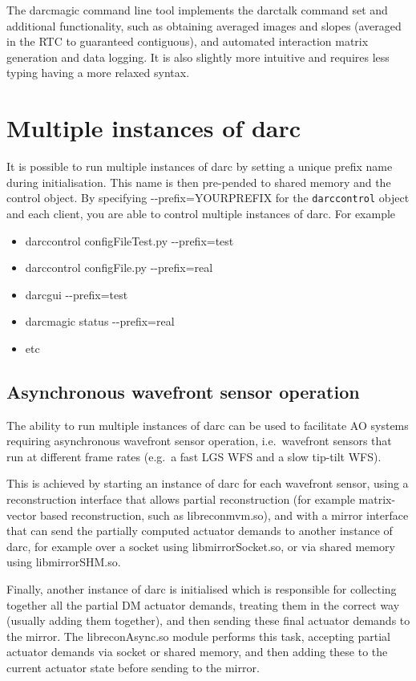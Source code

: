 \documentclass[a4,10pt]{article}
\begin{document}
The darcmagic command line tool implements the darctalk command set
and additional functionality, such as obtaining averaged images and
slopes (averaged in the RTC to guaranteed contiguous), and automated
interaction matrix generation and data logging.  It is also slightly
more intuitive and requires less typing having a more relaxed syntax.

\section{Multiple instances of darc}
It is possible to run multiple instances of darc by setting a unique prefix
name during initialisation.  This name is then pre-pended to shared
memory and the control object.  By specifying -{-}prefix=YOURPREFIX for
the {\tt darccontrol} object and each client, you are able to control
multiple instances of darc.  For example
\begin{itemize}
\item darccontrol configFileTest.py -{-}prefix=test
\item darccontrol configFile.py -{-}prefix=real
\item darcgui -{-}prefix=test
\item darcmagic status -{-}prefix=real
\item etc
\end{itemize}

\subsection{Asynchronous wavefront sensor operation}
The ability to run multiple instances of darc can be used to
facilitate AO systems requiring asynchronous wavefront sensor
operation, i.e.\ wavefront sensors that run at different frame rates
(e.g.\ a fast LGS WFS and a slow tip-tilt WFS).

This is achieved by starting an instance of darc for each wavefront
sensor, using a reconstruction interface that allows partial
reconstruction (for example matrix-vector based reconstruction, such
as libreconmvm.so), and with a mirror interface that can send the
partially computed actuator demands to another instance of darc, for
example over a socket using libmirrorSocket.so, or via shared memory
using libmirrorSHM.so.

Finally, another instance of darc is initialised which is responsible
for collecting together all the partial DM actuator demands, treating
them in the correct way (usually adding them together), and then
sending these final actuator demands to the mirror.  The
libreconAsync.so module performs this task, accepting partial actuator
demands via socket or shared memory, and then adding these to the
current actuator state before sending to the mirror.
\end{document}
